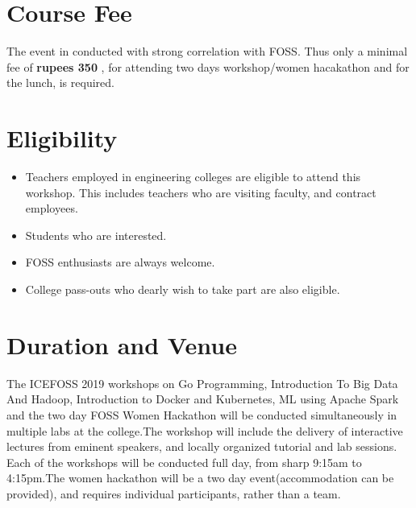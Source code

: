 \documentclass[notuble,10pt,a4paper]{leaflet}
\begin{document}
\section{{\Large Course Fee}}

The event in conducted with strong correlation with FOSS. Thus only a minimal fee of \textbf{ rupees 350 }, for attending two days workshop/women hacakathon and for the lunch, is required.

\newpage
\section{{\Large Eligibility}}

\begin{itemize}
\item Teachers employed in engineering colleges are eligible to attend this workshop. This includes teachers who are visiting faculty, and contract employees.
\item Students who are interested.
\item FOSS enthusiasts are always welcome.
\item College pass-outs who dearly wish to take part are also eligible.
\end{itemize}

\section{{\Large Duration and Venue}}
The ICEFOSS 2019 workshops on Go Programming, Introduction To Big Data And Hadoop, Introduction to Docker and Kubernetes, ML using Apache Spark and the two day FOSS Women Hackathon will be conducted simultaneously in multiple labs at the college.The workshop will include the delivery of interactive lectures from eminent speakers, and locally organized tutorial and lab sessions.\\
Each of the workshops will be conducted full day, from sharp 9:15am to 4:15pm.The women hackathon will be a two day event(accommodation can be provided), and requires individual participants, rather than a team.
\newpage

\end{document}
